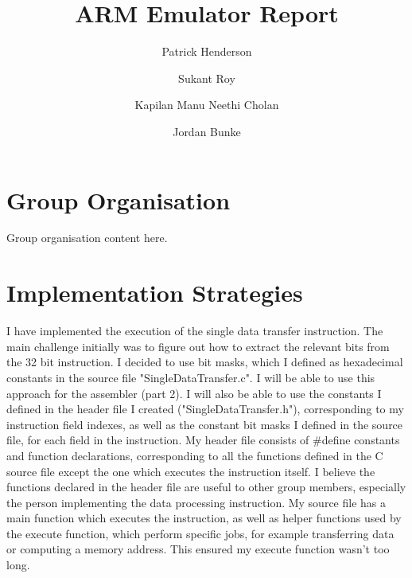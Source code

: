 \documentclass[11pt]{article}
\begin{document}
\title{ARM Emulator Report}
\author{
    Patrick Henderson\\
    \and
    Sukant Roy\\
    \and
  	Kapilan Manu Neethi Cholan\\
  	\and
  	Jordan Bunke
}

\maketitle

\section{Group Organisation}

	Group organisation content here.

\section{Implementation Strategies}
    I have implemented the execution of the single data transfer instruction. The
    main challenge initially was to figure out how to extract the relevant bits from
    the 32 bit instruction. I decided to use bit masks, which I defined as hexadecimal
    constants in the source file "SingleDataTransfer.c". I will be able to use this
    approach for the assembler (part 2). I will also be able to use the constants
    I defined in the header file I created ("SingleDataTransfer.h"), corresponding
    to my instruction field indexes, as well as the constant bit masks I defined in
    the source file, for each field in the instruction. My header file
    consists of #define constants and function declarations, corresponding to all
    the functions defined in the C source file except the one which executes the
    instruction itself. I believe the functions declared in the header file are useful to
    other group members, especially the person implementing the data processing instruction.
    My source file has a main function which executes the instruction, as well as helper functions
    used by the execute function, which perform specific jobs, for example transferring data or
    computing a memory address. This ensured my execute function wasn't too long.
\end{document}
